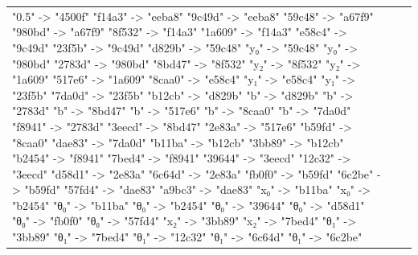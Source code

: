 \documentclass{beamer}
\begin{document}
\begin{frame}[fragile]
\begin{table}[H]
\begin{tabular}{lll}
\begin{adjustbox}{minipage={.4\textwidth}, height=0.22\textwidth, margin*=0cm 0cm 0cm 0.1cm}
{                          "0.5" -> "4500f"
                          "f14a3" -> "eeba8"
                          "9c49d" -> "eeba8"
                          "59c48" -> "a67f9"
                          "980bd" -> "a67f9"
                          "8f532" -> "f14a3"
                          "1a609" -> "f14a3"
                          "e58c4" -> "9c49d"
                          "23f5b" -> "9c49d"
                          "d829b" -> "59c48"
                          "y₀" -> "59c48"
                          "y₀" -> "980bd"
                          "2783d" -> "980bd"
                          "8bd47" -> "8f532"
                          "y₂" -> "8f532"
                          "y₂" -> "1a609"
                          "517e6" -> "1a609"
                          "8caa0" -> "e58c4"
                          "y₁" -> "e58c4"
                          "y₁" -> "23f5b"
                          "7da0d" -> "23f5b"
                          "b12cb" -> "d829b"
                          "b" -> "d829b"
                          "b" -> "2783d"
                          "b" -> "8bd47"
                          "b" -> "517e6"
                          "b" -> "8caa0"
                          "b" -> "7da0d"
                          "f8941" -> "2783d"
                          "3eecd" -> "8bd47"
                          "2e83a" -> "517e6"
                          "b59fd" -> "8caa0"
                          "dae83" -> "7da0d"
                          "b11ba" -> "b12cb"
                          "3bb89" -> "b12cb"
                          "b2454" -> "f8941"
                          "7bed4" -> "f8941"
                          "39644" -> "3eecd"
                          "12c32" -> "3eecd"
                          "d58d1" -> "2e83a"
                          "6c64d" -> "2e83a"
                          "fb0f0" -> "b59fd"
                          "6c2be" -> "b59fd"
                          "57fd4" -> "dae83"
                          "a9bc3" -> "dae83"
                          "x₀" -> "b11ba"
                          "x₀" -> "b2454"
                          "θ₀" -> "b11ba"
                          "θ₀" -> "b2454"
                          "θ₀" -> "39644"
                          "θ₀" -> "d58d1"
                          "θ₀" -> "fb0f0"
                          "θ₀" -> "57fd4"
                          "x₂" -> "3bb89"
                          "x₂" -> "7bed4"
                          "θ₁" -> "3bb89"
                          "θ₁" -> "7bed4"
                          "θ₁" -> "12c32"
                          "θ₁" -> "6c64d"
                          "θ₁" -> "6c2be"
}
\end{adjustbox}
\end{tabular}
\end{table}
\end{frame}
\end{document}
